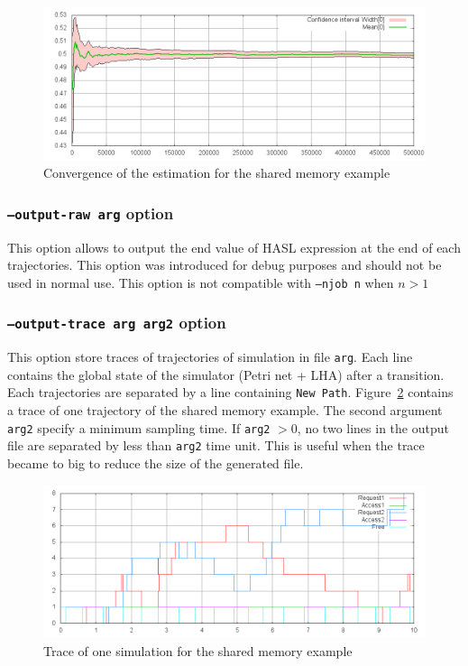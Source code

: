 \documentclass{article}
\begin{document}
\begin{figure}[h]
  \centering
  \includegraphics[width=1.01\textwidth]{figures/convergence.png}
  \caption{Convergence of the estimation for the shared memory example}
  \label{fig:convergence}
\end{figure}

\subsubsection{\texttt{--output-raw arg} option}
This option allows to output the end value of HASL expression at
the end of each trajectories. This option was introduced for debug 
purposes and should not be used in normal use. This option is not compatible
with \texttt{--njob n} when $n>1$

\subsubsection{\texttt{--output-trace arg arg2} option}
This option store traces of trajectories of simulation in file
\texttt{arg}.  Each line contains the global state of the simulator
(Petri net + LHA) after a transition.  Each trajectories are separated
by a line containing \texttt{New Path}.  Figure~\ref{fig:trace}
contains a trace of one trajectory of the shared memory example.  The
second argument \texttt{arg2} specify a minimum sampling time. If
\texttt{arg2} $>0$, no two lines in the output file are separated by
less than \texttt{arg2} time unit. This is useful when the trace
became to big to reduce the size of the generated file.

\begin{figure}[h]
  \centering
  \includegraphics[width=1.01\textwidth]{figures/trace.png}
  \caption{Trace of one simulation for the shared memory example}
  \label{fig:trace}
\end{figure}
\end{document}
